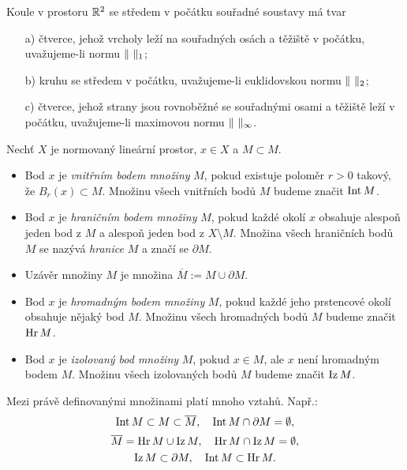 \begin{ex}
Koule v prostoru $\mathbb R^2$ se středem v počátku souřadné soustavy má tvar
\begin{itemize}
\item[a)] čtverce, jehož vrcholy leží na souřadných osách a těžiště v počátku, uvažujeme-li normu $\|\ \|_1$;
\item[b)] kruhu se středem v počátku, uvažujeme-li euklidovskou normu $\norm{\ }_2$;
\item[c)] čtverce, jehož strany jsou rovnoběžné se souřadnými osami a těžiště leží v počátku, uvažujeme-li maximovou normu $\norm{\ }_\infty$.
\end{itemize}
\end{ex}

\begin{df}
Nechť $X$ je normovaný lineární prostor, $x\in X$ a $M\subset M$.
\begin{itemize}
\item Bod $x$ je \emph{vnitřním bodem množiny} $M$, pokud existuje poloměr $r>0$ takový, že $B_r(x)\subset M$.
Množinu všech vnitřních bodů $M$ budeme značit $\operatorname{Int} M$.
\item Bod $x$ je \emph{hraničním bodem množiny} $M$, pokud každé okolí $x$ obsahuje alespoň jeden bod z $M$ a alespoň jeden bod z $X\setminus M$.
Množina všech hraničních bodů $M$ se nazývá \emph{hranice} $M$ a značí se $\partial M$.
\item Uzávěr množiny $M$ je množina $\overline M:=M\cup\partial M$.
\item Bod $x$ je \emph{hromadným bodem množiny} $M$, pokud každé jeho prstencové okolí obsahuje nějaký bod $M$.
Množinu všech hromadných bodů $M$ budeme značit $\operatorname{Hr} M$.
\item Bod $x$ je \emph{izolovaný bod množiny} $M$, pokud $x\in M$, ale $x$ není hromadným bodem $M$.
Množinu všech izolovaných bodů $M$ budeme značit $\operatorname{Iz} M$.
\end{itemize}
\end{df}

Mezi právě definovanými množinami platí mnoho vztahů. Např.:
\[ \operatorname{Int} M\subset M \subset \overline M, \quad \operatorname{Int} M\cap \partial M = \emptyset, \]
\[ \overline M = \operatorname{Hr} M \cup \operatorname{Iz} M, \quad \operatorname{Hr} M \cap \operatorname{Iz} M = \emptyset, \]
\[ \operatorname{Iz} M \subset \partial M, \quad \operatorname{Int} M \subset \operatorname{Hr} M. \]



